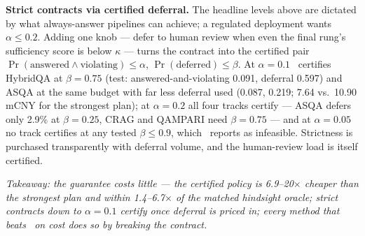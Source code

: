 \textbf{Strict contracts via certified deferral.} The headline levels
above are dictated by what always-answer pipelines can achieve; a
regulated deployment wants $\alpha \le 0.2$. Adding one knob --- defer
to human review when even the final rung's sufficiency score is below
$\kappa$ --- turns the contract into the certified pair
$\Pr(\text{answered} \wedge \text{violating}) \le \alpha$,
$\Pr(\text{deferred}) \le \beta$. At $\alpha=0.1$ \system\ certifies
HybridQA at $\beta=0.75$ (test: answered-and-violating 0.091, deferral
0.597) and ASQA at the same budget with far less deferral used (0.087,
0.219; 7.64 vs.\ 10.90 mCNY for the strongest plan); at $\alpha=0.2$
all four tracks certify --- ASQA defers only 2.9\% at $\beta=0.25$,
CRAG and QAMPARI need $\beta=0.75$ --- and at $\alpha=0.05$ no track
certifies at any tested $\beta \le 0.9$, which \system\ reports as
infeasible. Strictness is purchased transparently with deferral volume,
and the human-review load is itself certified.

\smallskip\noindent\textit{Takeaway: the guarantee costs little --- the
certified policy is 6.9--20$\times$ cheaper than the strongest plan and
within 1.4--6.7$\times$ of the matched hindsight oracle; strict
contracts down to $\alpha=0.1$ certify once deferral is priced in; every
method that beats \system\ on cost does so by breaking the contract.}

